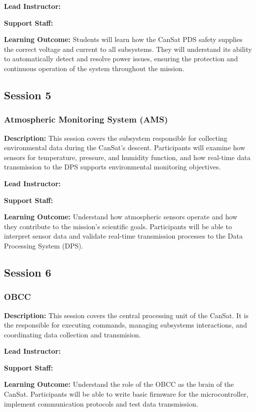 \documentclass[a4paper,12pt]{article}
\begin{document}
\textbf{Lead Instructor:}

\textbf{Support Staff: }

\textbf{Learning Outcome:} Students will learn how the CanSat PDS safety supplies the correct voltage and current to all subsystems. They will understand its ability to automatically detect and resolve power issues, ensuring the protection and continuous operation of the system throughout the mission.

\newpage

\subsection{Session 5}
\subsubsection{Atmospheric Monitoring System (AMS)}

\textbf{Description:} This session covers the subsystem responsible for collecting environmental data during the CanSat's descent. Participants will examine how sensors for temperature, pressure, and humidity function, and how real-time data transmission to the DPS supports environmental monitoring objectives.

\textbf{Lead Instructor:}

\textbf{Support Staff: }

\textbf{Learning Outcome:} Understand how atmospheric sensors operate and how they contribute to the mission’s scientific goals. Participants will be able to interpret sensor data and validate real-time transmission processes to the Data Processing System (DPS).

\newpage

\subsection{Session 6}
\subsubsection{OBCC}

\textbf{Description:} This session covers the central processing unit of the CanSat. It is the responsible for executing commands, managing subsystems interactions, and coordinating data collection and transmision.

\textbf{Lead Instructor:}

\textbf{Support Staff: }

\textbf{Learning Outcome:} Understand the role of the OBCC as the brain of the CanSat. Participants will be able to write basic firmware for the microcontroller, implement communication protocols and test data transmission.
\end{document}
